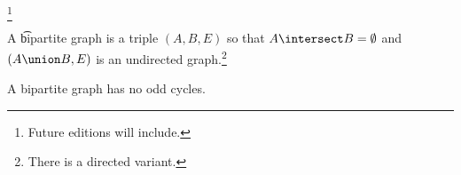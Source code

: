 
\footnote{Future editions will include.}


A \t{bipartite graph} is a triple $(A, B, E)$ so that $A \intersect B = \emptyset$ and $(A \union B, E)$ is an undirected graph.\footnote{There is a directed variant.}

\begin{proposition}
  A bipartite graph has no odd cycles.
\end{proposition}

\blankpage
